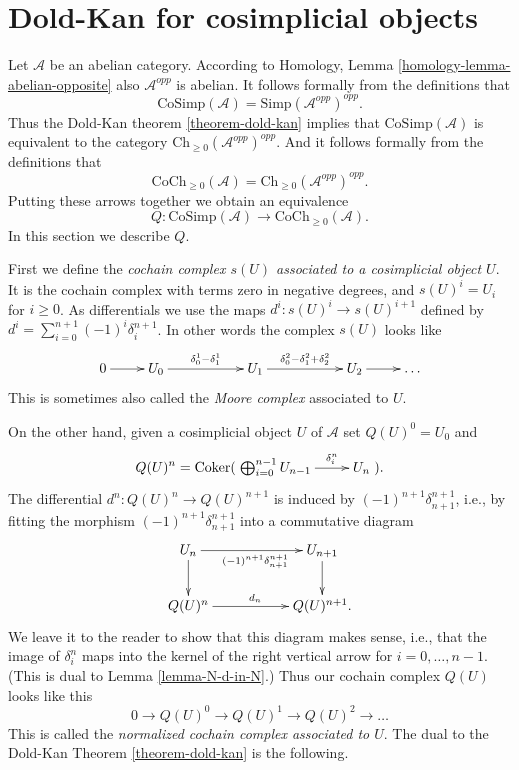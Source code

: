 \section{Dold-Kan for cosimplicial objects}
\label{section-dold-kan-cosimplicial}

\noindent
Let $\mathcal{A}$ be an abelian category.
According to Homology, Lemma \ref{homology-lemma-abelian-opposite}
also $\mathcal{A}^{opp}$ is abelian. It follows
formally from the definitions that
$$
\text{CoSimp}(\mathcal{A}) = \text{Simp}(\mathcal{A}^{opp})^{opp}.
$$
Thus the Dold-Kan theorem \ref{theorem-dold-kan} implies
that $\text{CoSimp}(\mathcal{A})$ is equivalent to
the category
$\text{Ch}_{\geq 0}(\mathcal{A}^{opp})^{opp}$. And it
follows formally from the definitions that
$$
\text{CoCh}_{\geq 0}(\mathcal{A}) =
\text{Ch}_{\geq 0}(\mathcal{A}^{opp})^{opp}.
$$
Putting these arrows together we obtain an equivalence
$$
Q :
\text{CoSimp}(\mathcal{A})
\longrightarrow
\text{CoCh}_{\geq 0}(\mathcal{A}).
$$
In this section we describe $Q$.

\medskip\noindent
First we define the
{\it cochain complex $s(U)$ associated to a cosimplicial
object $U$}. It is the cochain complex with terms zero in
negative degrees, and $s(U)^i = U_i$ for $i \geq 0$.
As differentials we use the maps
$d^i : s(U)^i \to s(U)^{i + 1}$ defined by
$d^i = \sum_{i = 0}^{n + 1} (-1)^i \delta^{n + 1}_i$.
In other words the complex $s(U)$ looks like
$$
\xymatrix{
0 \ar[r] &
U_0 \ar[rr]^{\delta^1_0 - \delta^1_1} & &
U_1 \ar[rr]^{\delta^2_0 - \delta^2_1 + \delta^2_2} & &
U_2 \ar[r] &
\ldots
}
$$
This is sometimes also called the {\it Moore complex} associated
to $U$.

\medskip\noindent
On the other hand, given a
cosimplicial object $U$ of $\mathcal{A}$ set
$Q(U)^0 = U_0$ and
$$
Q(U)^n = \text{Coker}(
\xymatrix{
\bigoplus_{i = 0}^{n - 1} U_{n - 1} \ar[r]^-{\delta^n_i} &
U_n
}).
$$
The differential $d^n : Q(U)^n \to Q(U)^{n + 1}$
is induced by $(-1)^{n + 1}\delta^{n + 1}_{n + 1}$, i.e., by
fitting the morphism
$(-1)^{n + 1}\delta^{n + 1}_{n + 1}$
into a commutative
diagram
$$
\xymatrix{
U_n \ar[rr]_{(-1)^{n + 1}\delta^{n + 1}_{n + 1}} \ar[d] & &
U_{n + 1} \ar[d] \\
Q(U)^n \ar[rr]^{d_n} & &
Q(U)^{n + 1}.
}
$$
We leave it to the reader to show that this diagram makes
sense, i.e., that the image of $\delta^n_i$ maps into
the kernel of the right vertical arrow for $i = 0, \ldots, n - 1$.
(This is dual to Lemma \ref{lemma-N-d-in-N}.)
Thus our cochain complex $Q(U)$ looks like this
$$
0 \to Q(U)^0 \to Q(U)^1 \to Q(U)^2 \to \ldots
$$
This is called the {\it normalized cochain complex associated
to $U$}.
The dual to the Dold-Kan Theorem \ref{theorem-dold-kan} is the following.

